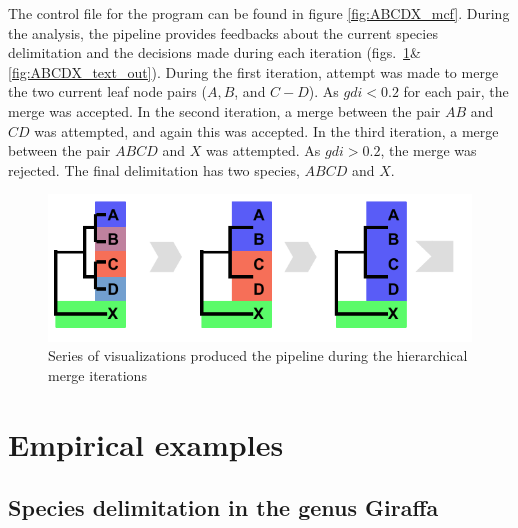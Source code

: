 \documentclass{article1}
\newcommand{\blue}[1]{{\color{blue}{#1}}}
\begin{document}
The control file for the program can be found in figure \ref{fig:ABCDX_mcf}.  During the
analysis, the pipeline provides feedbacks about the current species delimitation and the
decisions made during each iteration
(figs.~\ref{fig:ABCDX_out}\&\ref{fig:ABCDX_text_out}).  During the first iteration,
attempt was made to merge the two current leaf node pairs ($A,B$, and $C-D$).  As $gdi
<0.2$ for each pair, the merge was accepted.  In the second iteration, a merge between
the pair $AB$ and $CD$ was attempted, and again this was accepted.  In the third
iteration, a merge between the pair $ABCD$ and $X$ was attempted.  As $gdi > 0.2$, the
merge was rejected.  The final delimitation has two species, $ABCD$ and $X$.

\begin{figure}[t]
	\centering %
	\includegraphics[scale=0.70]{figs/Pipedemo/progress} %
	
   \caption{Series of visualizations produced the pipeline during the hierarchical merge iterations %
   	\blue{[updated figure]}
   } \label{fig:ABCDX_out}
\end{figure}


\FloatBarrier
\section{Empirical examples}
\subsection{Species delimitation in the genus Giraffa}
\end{document}
